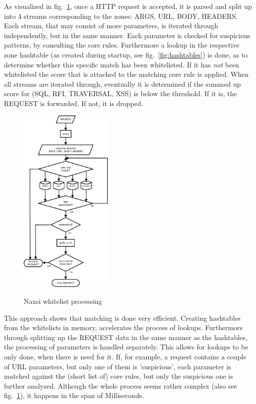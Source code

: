 \documentclass[Naxsi]{subfiles}
\begin{document}
As visualized in fig.~\ref{fig:whitelist_processing}, once a HTTP request is accepted, it is parsed and split up into 4 streams corresponding to the zones: ARGS, URL, BODY, HEADERS. Each stream, that may consist of more parameters, is iterated through independently, but in the same manner. Each parameter is checked for suspicious patterns, by consulting the core rules. Furthermore a lookup in the respective zone hashtable (as created during startup, see fig.~\ref{fig:hashtables}) is done, as to determine whether this specific match has been whitelisted. If it has \emph{not} been whitelisted the score that is attached to the matching core rule is applied. When all streams are iterated through, eventually it is determined if the summed up score for (SQL, RFI, TRAVERSAL, XSS) is below the threshold. If it is, the REQUEST is forwarded. If not, it is dropped. 

\begin{figure}[h]
\caption{Naxsi whitelist processing}
\centering
\includegraphics[width=0.4\textwidth] {images/whitelist_processing.png}
\label{fig:whitelist_processing}
\end{figure}

This approach shows that matching is done very efficient. Creating hashtables from the whitelists in memory, accelerates the process of lookups. Furthermore through splitting up the REQUEST data in the same manner as the hashtables, the processing of parameters is handled separately. This allows for lookups to be only done, when there is need for it. If, for example, a request contains a couple of URL parameters, but only one of them is 'suspicious', each parameter is matched against the (short list of) core rules, but only the suspicious one is further analyzed. Although the whole process seems rather complex (also see fig.~\ref{fig:whitelist_processing}), it happens in the span of Milliseconds.
\end{document}
